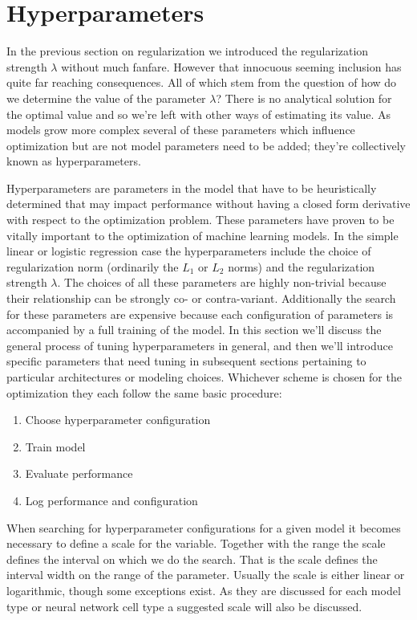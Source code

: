\section{Hyperparameters}\label{sec:hyperparams}

In the previous section on regularization we introduced the regularization strength $\lambda$ without much fanfare. However that innocuous seeming inclusion has quite far reaching consequences. All of which stem from the question of how do we determine the value of the parameter $\lambda$? There is no analytical solution for the optimal value and so we're left with other ways of estimating its value. As models grow more complex several of these parameters which influence optimization but are not model parameters need to be added; they're collectively known as hyperparameters.

Hyperparameters are parameters in the model that have to be heuristically determined that may impact performance without having a closed form derivative with respect to the optimization problem. These parameters have proven to be vitally important to the optimization of machine learning models. In the simple linear or logistic regression case the hyperparameters include the choice of regularization norm (ordinarily the $L_1$ or $L_2$ norms) and the regularization strength $\lambda$. The choices of all these parameters are highly non-trivial because their relationship can be strongly co- or contra-variant. Additionally the search for these parameters are expensive because each configuration of parameters is accompanied by a full training of the model. In this section we'll discuss the general process of tuning hyperparameters in general, and then we'll introduce specific parameters that need tuning in subsequent sections pertaining to particular architectures or modeling choices. Whichever scheme is chosen for the optimization they each follow the same basic procedure:

\begin{enumerate}
\item Choose hyperparameter configuration
\item Train model
\item Evaluate performance
\item Log performance and configuration
\end{enumerate}

\noindent When searching for hyperparameter configurations for a given model it becomes necessary to define a scale for the variable. Together with the range the scale defines the interval on which we do the search. That is the scale defines the interval width on the range of the parameter. Usually the scale is either linear or logarithmic, though some exceptions exist. As they are discussed for each model type or neural network cell type a suggested scale will also be discussed.

